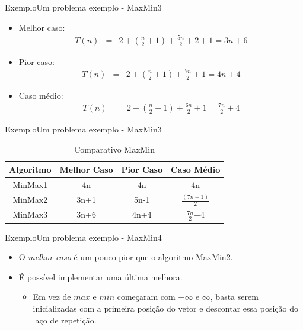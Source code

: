 \documentclass[aspectratio=169]{beamer}
\begin{document}

\begin{frame}{Exemplo}{Um problema exemplo - MaxMin3}
\begin{itemize}
\item Melhor caso:
\begin{eqnarray}
T(n) &=& 2 + (\frac{n}{2} + 1) + \frac{5n}{2} + 2 + 1=3n + 6\nonumber
\end{eqnarray}
\item Pior caso:
\begin{eqnarray}
T(n) &=& 2 + (\frac{n}{2} + 1) + \frac{7n}{2} + 1 = 4n + 4\nonumber
\end{eqnarray}
\item Caso médio:
\begin{eqnarray}
T(n) &=& 2 + (\frac{n}{2} + 1) + \frac{6n}{2} + 1 = \frac{7n}{2} + 4\nonumber
\end{eqnarray}
\end{itemize}
\end{frame}


\begin{frame}{Exemplo}{Um problema exemplo - MaxMin3}
\begin{table}[]
\centering
\caption{Comparativo MaxMin}
\label{Comparativo1 MaxMin}
\begin{tabular}{c|ccc}
Algoritmo  &  Melhor Caso  &  Pior Caso  &  Caso Médio  \\
\hline
MinMax1  &   4n       &       4n   &  4n \\
MinMax2  &   3n+1     &       5n-1   &  $\frac{(7n -1)}{2}$ \\
MinMax3  &   3n+6     & 4n+4    &  $\frac{7n}{2}$+4 \\
\end{tabular}
\end{table}
\end{frame}


\begin{frame}[fragile]{Exemplo}{Um problema exemplo - MaxMin4}
\begin{itemize}
\item O {\it melhor caso} é um pouco pior que o algoritmo MaxMin2. 
\item É possível implementar uma última melhora.
\begin{itemize}
\item Em vez de $max$ e $min$ começaram com $-\infty$ e $\infty$, basta serem inicializadas com a primeira posição do vetor e descontar essa posição do laço de repetição.
\end{itemize}
\end{itemize}
\end{frame}
\end{document}
